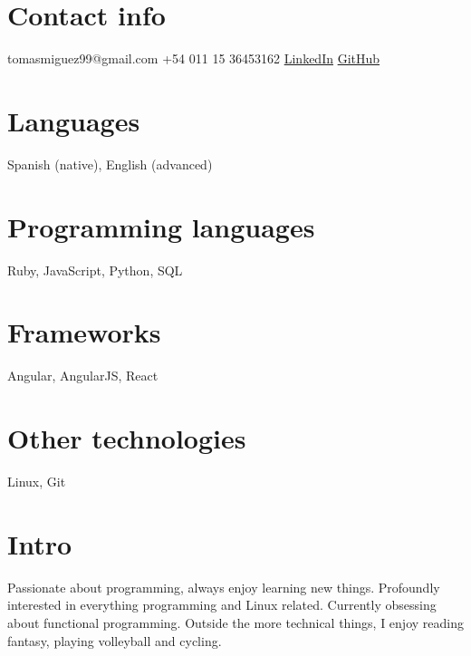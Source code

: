 \documentclass[espanol]{cv-style}     %
\begin{document}
\lastupdated

\begin{aside}
%
\section{Contact info}
tomasmiguez99@gmail.com
+54 011 15 36453162
\href{https://www.linkedin.com/in/tom\%C3\%A1s-miguez-a53327241}{LinkedIn}
\href{https://github.com/tomasmiguez}{GitHub}
%
\section{Languages}
Spanish (native),
English (advanced)
%
\section{Programming languages}
Ruby, JavaScript, Python, SQL
%
\section{Frameworks}
Angular, AngularJS, React
%
\section{Other technologies}
Linux, Git
%
\end{aside}
\vspace{0.2cm}
\section{Intro}
  \vspace{-0.2cm}
  Passionate about programming, always enjoy learning new things. Profoundly interested in
  everything programming and Linux related. Currently obsessing about functional programming.
  Outside the more technical things, I enjoy reading fantasy, playing volleyball and cycling.
\end{document}
